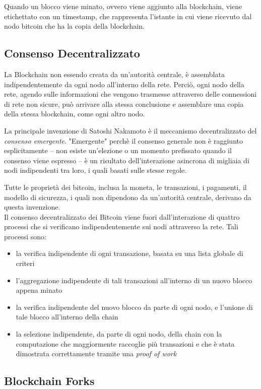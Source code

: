Quando un blocco viene minato, ovvero viene aggiunto alla blockchain, viene etichettato con un timestamp, che rappresenta l'istante in cui viene ricevuto dal nodo bitcoin che ha la copia della blockchain.

\subsection{Consenso Decentralizzato}

La Blockchain non essendo creata da un'autorità centrale, è assemblata indipendentemente da ogni nodo all'interno della rete. Perciò, ogni nodo della rete, agendo sulle informazioni che vengono trasmesse attraverso delle connessioni di rete non sicure, può arrivare alla stessa conclusione e assemblare una copia della stessa blockchain, come ogni altro nodo.

La principale invenzione di Satoshi Nakamoto è il meccanismo decentralizzato del \textit{consenso emergente}. "Emergente" perchè il consenso generale non è raggiunto esplicitamente -- non esiste un'elezione o un momento prefissato quando il consenso viene espresso -- è un risultato dell'interazione asincrona di migliaia di nodi indipendenti tra loro, i quali basati sulle stesse regole.

Tutte le proprietà dei bitcoin, inclusa la moneta, le transazioni, i pagamenti, il modello di sicurezza, i quali non dipendono da un'autorità centrale, derivano da questa invenzione.\\
Il consenso decentralizzato dei Bitcoin viene fuori dall'interazione di quattro processi che si verificano indipendentemente sui nodi attraverso la rete. Tali processi sono:
\begin{itemize}
	\item la verifica indipendente di ogni transazione, basata su una lista globale di criteri
	\item  l'aggregazione indipendente di tali transazioni all'interno di un nuovo blocco appena minato
	\item la verifica indipendente del nuovo blocco da parte di ogni nodo, e l'unione di tale blocco all'interno della chain
	\item la selezione indipendente, da parte di ogni nodo, della chain con la computazione che maggiormente raccoglie più transazioni e che è stata dimostrata correttamente tramite una \textit{proof of work}
\end{itemize}
\cite{antonopoulos2014mastering}

\subsection{Blockchain Forks}

